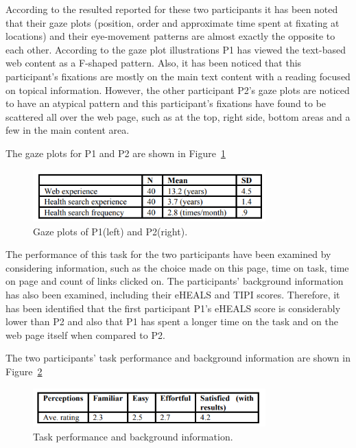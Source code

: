 \documentclass[]{article}
\begin{document}
According to the resulted reported for these two participants it has been noted that their gaze plots (position, order and approximate time spent at fixating at locations) and their eye-movement patterns are almost exactly the opposite to each other. According to the gaze plot illustrations P1 has viewed the text-based web content as a F-shaped pattern. Also, it has been noticed that this participant’s fixations are mostly on the main text content with a reading focused on topical information. However, the other participant P2’s gaze plots are noticed to have an atypical pattern and this participant’s fixations have found to be scattered all over the web page, such as at the top, right side, bottom areas and a few in the main content area.    

The gaze plots for P1 and P2 are shown in Figure~\ref{fig1}

\begin{figure}[b!]
	\includegraphics[width=0.8\textwidth]{Capture1.png}
	\caption{Gaze plots of P1(left) and P2(right). \label{fig1}}
\end{figure}      

The performance of this task for the two participants have been examined by considering information, such as the choice made on this page, time on task, time on page and count of links clicked on. The participants’ background information has also been examined, including their eHEALS and TIPI scores. Therefore, it has been identified that the first participant P1’s eHEALS score is considerably lower than P2 and also that P1 has spent a longer time on the task and on the web page itself when compared to P2.      

The two participants' task performance and background information are shown in Figure~\ref{fig2}

\begin{figure}[t!]
	\includegraphics[width=0.8\textwidth]{Capture2.png}
	\caption{Task performance and background information. \label{fig2}}
\end{figure}  
\end{document}
